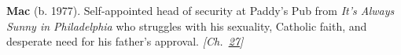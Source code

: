 \textbf{Mac} (b. 1977). Self-appointed head of security at Paddy's Pub from \emph{It's Always Sunny in Philadelphia} who struggles with his sexuality, Catholic faith, and desperate need for his father's approval. \emph{[Ch.~\hyperref[ch:planetaryskycolors]{27}]}

